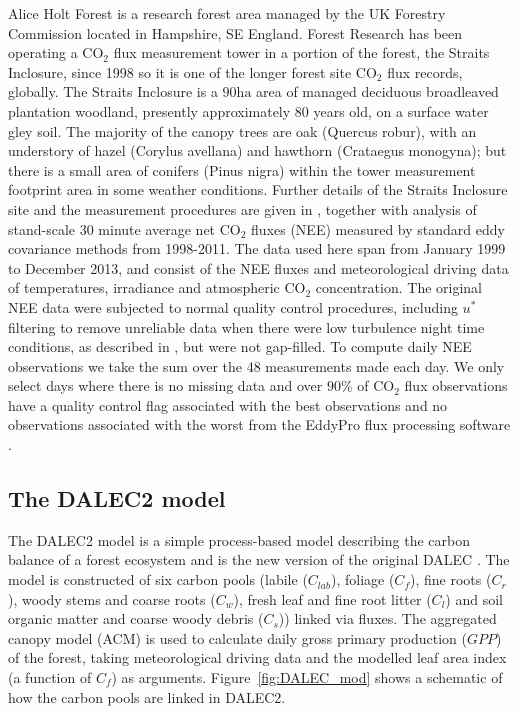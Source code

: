 \documentclass[review]{elsarticle}
\begin{document}
Alice Holt Forest is a research forest area managed by the UK Forestry Commission located in Hampshire, SE England. Forest Research has been operating a $\text{CO}_{2}$ flux measurement tower in a portion of the forest, the Straits Inclosure, since 1998 so it is one of the longer forest site $\text{CO}_2$ flux records, globally. The Straits Inclosure is a $90 \text{ha}$ area of managed deciduous broadleaved plantation woodland, presently approximately $80$ years old, on a surface water gley soil. The majority of the canopy trees are oak (Quercus robur), with an understory of hazel (Corylus avellana) and hawthorn (Crataegus monogyna); but there is a small area of conifers (Pinus nigra) within the tower measurement footprint area in some weather conditions. Further details of the Straits Inclosure site and the measurement procedures are given in \citet{wilkinson2012inter}, together with analysis of stand-scale $30$ minute average net $\text{CO}_{2}$ fluxes (NEE) measured by standard eddy covariance methods from 1998-2011. The data used here span from January 1999 to December 2013, and consist of the NEE fluxes and meteorological driving data of temperatures, irradiance and atmospheric $\text{CO}_2$ concentration. The original NEE data were subjected to normal quality control procedures, including $u^{*}$ filtering to remove unreliable data when there were low turbulence night time conditions, as described in \citet{wilkinson2012inter}, but were not gap-filled. To compute daily NEE observations we take the sum over the 48 measurements made each day. We only select days where there is no missing data and over $90\% $ of $\text{CO}_2$ flux observations have a quality control flag associated with the best observations and no observations associated with the worst from the EddyPro flux processing software \citep{eddypro}.

\subsection{The DALEC2 model}

The DALEC2 model is a simple process-based model describing the carbon balance of a forest ecosystem \citep{Bloom2015} and is the new version of the original DALEC \citep{williams2005improved}. The model is constructed of six carbon pools (labile ($C_{lab}$), foliage ($C_f$), fine roots ($C_r$), woody stems and coarse roots ($C_w$), fresh leaf and fine root litter ($C_l$) and soil organic matter and coarse woody debris ($C_s$)) linked via fluxes. The aggregated canopy model (ACM) \citep{williams1997predicting} is used to calculate daily gross primary production ($GPP$) of the forest, taking meteorological driving data and the modelled leaf area index (a function of $C_f$) as arguments. Figure~\ref{fig:DALEC_mod} shows a schematic of how the carbon pools are linked in DALEC2.   
\end{document}
